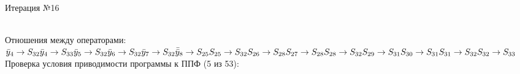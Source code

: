 \documentclass[a4paper,14pt]{article}
\begin{document}
\newpage \\ 
\begin{center}\huge Итерация №16 \end{center}\\
Отношения между операторами: \\ \newline
\begin{math}
    \bar{y}_{4} \rightarrow S_{32} \\ 
\bar{y}_{4} \rightarrow S_{33} \\ 
\bar{y}_{5} \rightarrow S_{32} \\ 
\bar{y}_{6} \rightarrow S_{32} \\ 
\bar{y}_{7} \rightarrow S_{32} \\ 
\bar{\bar{y}}_{8} \rightarrow S_{25} \\ 
S_{25} \rightarrow S_{32} \\ 
S_{26} \rightarrow S_{28} \\ 
S_{27} \rightarrow S_{28} \\ 
S_{28} \rightarrow S_{32} \\ 
S_{29} \rightarrow S_{31} \\ 
S_{30} \rightarrow S_{31} \\ 
S_{31} \rightarrow S_{32} \\ 
S_{32} \rightarrow S_{33}
\end{math}\\ \newline
%
Проверка условия приводимости программы к ППФ (5 из 53): \\
\end{document}
